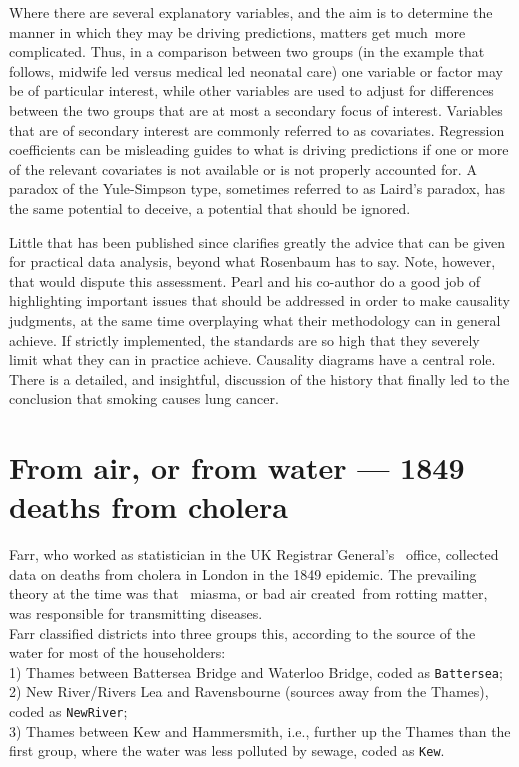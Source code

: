 \documentclass[
  10pt,
  b5paper]{book}
\begin{document}
Where there are several explanatory variables, and the aim is
to determine the manner in which they may be driving predictions,
matters get much~more complicated. Thus, in a comparison
between two groups (in the example that follows, midwife led
versus medical led neonatal care) one variable or factor may
be of particular interest, while other variables are used to
adjust for differences between the two groups that are at
most a secondary focus of interest. Variables that are of
secondary interest are commonly referred to as covariates.
Regression coefficients can be misleading guides to what is
driving predictions if one or more of the relevant covariates
is not available or is not properly accounted for. A paradox
of the Yule-Simpson type, sometimes referred to as Laird's
paradox, has the same potential to deceive, a potential that
should be ignored.

Little that has been published since \citet{RosBook} clarifies greatly the
advice that can be given for practical data analysis, beyond what
Rosenbaum has to say. Note, however, that \citet{pearl2018book} would
dispute this assessment. Pearl and his co-author do a good job of
highlighting important issues that should be addressed in order to
make causality judgments, at the same time overplaying what their
methodology can in general achieve. If strictly implemented,
the standards are so high that they severely limit what they can
in practice achieve. Causality diagrams have a central role.
There is a detailed, and insightful, discussion of the history
that finally led to the conclusion that smoking causes lung cancer.

\hypertarget{from-air-or-from-water-1849-deaths-from-cholera}{%
\section{From air, or from water --- 1849 deaths from cholera}\label{from-air-or-from-water-1849-deaths-from-cholera}}

Farr, who worked as statistician in the UK Registrar General's~
office, collected data on deaths from cholera in London in the
1849 epidemic. The prevailing theory at the time was that~
miasma, or bad air created~from rotting matter, was responsible
for transmitting diseases.\\
Farr classified districts into three groups this, according
to the source of the water for most of the householders:\\
1) Thames between Battersea Bridge and Waterloo Bridge, coded
as \texttt{Battersea};\\
2) New River/Rivers Lea and Ravensbourne (sources away from
the Thames), coded as \texttt{NewRiver};\\
3) Thames between Kew and Hammersmith, i.e., further up the
Thames than the first group, where the water was less polluted
by sewage, coded as \texttt{Kew}.
\end{document}
